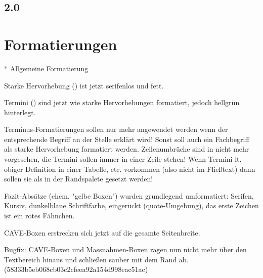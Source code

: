 \documentclass[ngerman,a4paper,fontsize=9pt,BCOR=0cm,DIV=11,headings=big,draft=no]{scrreprt}
\begin{document}
\section{2.0}








\chapter{Formatierungen}


    * Allgemeine Formatierung

Starke Hervorhebung
          () ist jetzt serifenlos und fett.

Termini () sind jetzt
          wie starke Hervorhebungen formatiert, jedoch hellgrün hinterlegt.

            Terminus-Formatierungen sollen nur mehr angewendet werden wenn der entsprechende Begriff an der Stelle erklärt wird! Sonst soll auch ein Fachbegriff als starke Hervorhebung formatiert werden.
            Zeilenumbrüche sind in  nicht mehr
            vorgesehen, die Termini sollen immer in einer Zeile stehen! Wenn Termini lt. obiger Definition in einer
            Tabelle, etc. vorkommen (also nicht im
            Fließtext) dann sollen sie als
             in der Randspalete gesetzt werden!

Fazit-Absätze (ehem.
          "gelbe Boxen") wurden grundlegend umformatiert: Serifen, Kursiv, dunkelblaue Schriftfarbe, eingerückt (quote-Umgebung), das erste Zeichen ist ein rotes Fähnchen.

CAVE-Boxen erstrecken
          sich jetzt auf die gesamte Seitenbreite.

 Bugfix: CAVE-Boxen und
          Massnahmen-Boxen ragen nun nicht mehr über den Textbereich hinaus und schließen sauber mit dem Rand ab. (58333b5eb068cb03c2cfeea92a154d998eac51ac)
\end{document}
